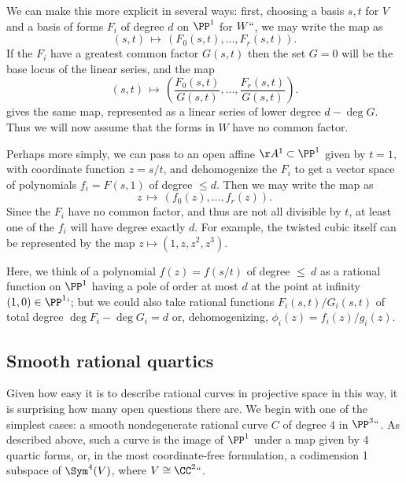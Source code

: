 \begingroup \let\;\,
We can make this more explicit in several ways: first, choosing a basis $s,t$ for $V$ and a basis of forms $F_i$ of degree $d$ on $\PP^1$ for $W` `$, we may write the map as
$$
(s,t) \; \mapsto \; \left(F_0(s,t), \dots, F_r(s,t)\right).
$$
If the $F_i$ have a greatest common factor $G(s,t)$ then the set $G=0$ will be the base locus
of the linear series, and the map
$$
(s,t) \; \mapsto \; \left( \frac{F_0(s,t)}{G(s,t)}, \dots, \frac{F_r(s,t)}{G(s,t)}\right).
$$
gives the same map, represented as a linear series of lower degree $d-\deg G$. Thus we
will now assume that the forms in $W$ have no common factor.

Perhaps
more simply,
we can pass to an open affine
$\AA^1\subset\PP^1$
given by $t=1$,
with coordinate function $z = s/t$, and
dehomogenize the $F_i$ to get a vector space of polynomials $f_i = F(s,1)$ of degree $\leq d$. Then we may write the
map as
$$
z \; \mapsto \; (f_0(z), \dots, f_r(z)).
$$
Since the $F_i$ have no common factor, and
thus
are not all divisible by $t$, at least one of the
$f_i$ will have degree exactly $d$.
For example, the twisted cubic itself can be represented by the map
$z \mapsto (1, z,z^2,z^3)$.

Here, we think of a polynomial $f(z) = f(s/t)$ of degree $\leq\ d$
as a rational function on $\PP^1$ having
a pole of order at most $d$ at the point at infinity $(1,0)\in \PP^1`$; but we could also take rational
functions $F_i(s,t)/G_i(s,t)$ of total degree $\deg F_i-\deg G_i = d$ or, dehomogenizing, $\phi_i(z) = f_i(z)/g_i(z)$.
\endgroup

\subsection*{Smooth rational quartics}

Given how easy it is to describe rational curves in projective space
%
in this way, it is surprising how many open questions there are. We
begin with
one of the simplest cases: a smooth nondegenerate rational curve $C$ of degree $4$ in $\PP^3` `$.
As described above, such a curve is the image of $\PP^1$ under a map given by 4 quartic forms,
or, in the most coordinate-free formulation, a codimension 1 subspace of $\Sym^4(V)$, where
$V\cong \CC^2` `$.

